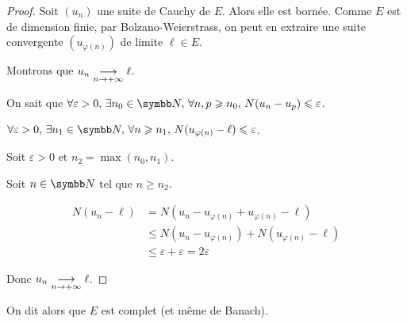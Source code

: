 \begin{proof}
    Soit $(u_n)$ une suite de Cauchy de $E$. Alors elle est bornée. 
    Comme $E$ est de dimension finie, par Bolzano-Weierstrass, on peut en extraire
    une suite convergente $(u_{\varphi(n)})$ de limite $\ell \in E$.

    Montrons que $u_n \underset{n \to +\infty}{\longrightarrow} \ell$.

    On sait que $\forall \varepsilon > 0, \, \exists n_0 \in \N, \, \forall n, p \geqslant n_0, \, N(u_n - u_p) \leqslant \varepsilon$. 

    $\forall \varepsilon > 0, \, \exists n_1 \in \N, \, \forall n \geqslant n_1, \, N(u_{\varphi(n)} - \ell) \leqslant \varepsilon$.

    Soit $\varepsilon > 0$ et $n_2 = \max(n_0, n_1)$.

    Soit $n \in \N$ tel que $n \geqslant n_2$.

    \begin{align*}
        N(u_n - \ell) & = N(u_n - u_{\varphi(n)} + u_{\varphi(n)} - \ell) \\
        & \leqslant N(u_n - u_{\varphi(n)}) + N(u_{\varphi(n)} - \ell) \\
        & \leqslant \varepsilon + \varepsilon = 2 \varepsilon
    \end{align*}

    Donc $u_n \underset{n \to +\infty}{\longrightarrow} \ell$.
\end{proof}


\begin{remarque}
    On dit alors que $E$ est complet (et même de Banach).
\end{remarque}
